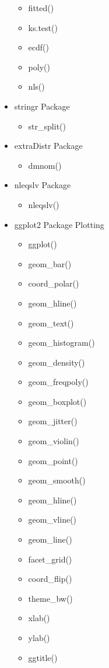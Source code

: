 \documentclass{article}
\begin{document}
\begin{multicols}{3}
\begin{itemize}
\begin{itemize}
    \item fitted()
    \item ks.test()
    \item ecdf()
    \item poly()
    \item nls()
  \end{itemize}
    \item stringr Package
  \begin{itemize}
    \item str\_split()
  \end{itemize}
    \item extraDistr Package
  \begin{itemize}
    \item dmnom()
  \end{itemize}
    \item nleqslv Package
  \begin{itemize}
    \item nleqslv()
  \end{itemize}
    \vfill\null \columnbreak
  \item ggplot2 Package Plotting
  \begin{itemize}
    \item ggplot()
    \item geom\_bar()
    \item coord\_polar()
    \item geom\_hline()
    \item geom\_text()
    \item geom\_histogram()
    \item geom\_density()
    \item geom\_freqpoly()
    \item geom\_boxplot()
    \item geom\_jitter()
    \item geom\_violin()
    \item geom\_point()
    \item geom\_smooth()
    \item geom\_hline()
    \item geom\_vline()
    \item geom\_line()
    \item facet\_grid()
    \item coord\_flip()
    \item theme\_bw()
    \item xlab()
    \item ylab()
    \item ggtitle()

\end{itemize}
\end{itemize}
\end{multicols}
\end{document}

